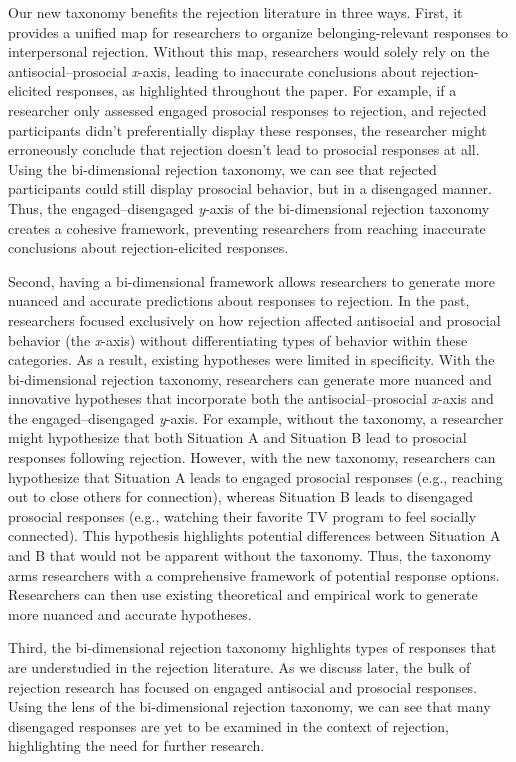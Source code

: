\documentclass[
]{udthesis}
\begin{document}
Our new taxonomy benefits the rejection literature in three ways. First,
it provides a unified map for researchers to organize belonging-relevant
responses to interpersonal rejection. Without this map, researchers
would solely rely on the antisocial--prosocial \emph{x}-axis, leading to
inaccurate conclusions about rejection-elicited responses, as
highlighted throughout the paper. For example, if a researcher only
assessed engaged prosocial responses to rejection, and rejected
participants didn't preferentially display these responses, the
researcher might erroneously conclude that rejection doesn't lead to
prosocial responses at all. Using the bi-dimensional rejection taxonomy,
we can see that rejected participants could still display prosocial
behavior, but in a disengaged manner. Thus, the engaged--disengaged
\emph{y}-axis of the bi-dimensional rejection taxonomy creates a cohesive
framework, preventing researchers from reaching inaccurate conclusions
about rejection-elicited responses.

Second, having a bi-dimensional framework allows researchers to generate
more nuanced and accurate predictions about responses to rejection. In
the past, researchers focused exclusively on how rejection affected
antisocial and prosocial behavior (the \emph{x}-axis) without differentiating
types of behavior within these categories. As a result, existing
hypotheses were limited in specificity. With the bi-dimensional
rejection taxonomy, researchers can generate more nuanced and innovative
hypotheses that incorporate both the antisocial--prosocial \emph{x}-axis and
the engaged--disengaged \emph{y}-axis. For example, without the taxonomy, a
researcher might hypothesize that both Situation A and Situation B lead
to prosocial responses following rejection. However, with the new
taxonomy, researchers can hypothesize that Situation A leads to engaged
prosocial responses (e.g., reaching out to close others for connection),
whereas Situation B leads to disengaged prosocial responses (e.g.,
watching their favorite TV program to feel socially connected). This
hypothesis highlights potential differences between Situation A and B
that would not be apparent without the taxonomy. Thus, the taxonomy arms
researchers with a comprehensive framework of potential response
options. Researchers can then use existing theoretical and empirical
work to generate more nuanced and accurate hypotheses.

Third, the bi-dimensional rejection taxonomy highlights types of
responses that are understudied in the rejection literature. As we
discuss later, the bulk of rejection research has focused on engaged
antisocial and prosocial responses. Using the lens of the bi-dimensional
rejection taxonomy, we can see that many disengaged responses are yet to
be examined in the context of rejection, highlighting the need for
further research.
\end{document}
